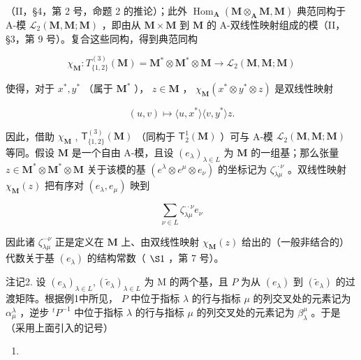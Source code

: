 （II，§4，第 2 号，命题 2 的推论）；此外 \(\operatorname{Hom}_{\mathbf{A}}(\mathbf{M} \otimes_{\mathbf{A}} \mathbf{M}, \mathbf{M})\) 典范同构于 A-模 \(\mathcal{L}_2(\mathbf{M}, \mathbf{M}; \mathbf{M})\) ，即由从 \(\mathbf{M} \times \mathbf{M}\) 到 \(\mathbf{M}\) 的 A-双线性映射组成的模（II，§3，第 9 号）。复合这些同构，得到典范同构

\[
\chi_ {\mathbf {M}} \colon T _ {\{1, 2 \}} ^ {(3)} (\mathbf {M}) = \mathbf {M} ^ {*} \otimes \mathbf {M} ^ {*} \otimes \mathbf {M} \rightarrow \mathcal {L} _ {2} (\mathbf {M}, \mathbf {M}; \mathbf {M})
\]

使得，对于 \(x^{*}, y^{*}\) （属于 \(\mathbf{M}^{*}\) ）， \(z \in \mathbf{M}\) ， \(\chi_{\mathbf{M}}(x^{*} \otimes y^{*} \otimes z)\) 是双线性映射

\[
(u, v) \mapsto \langle u, x ^ {*} \rangle \langle v, y ^ {*} \rangle z.
\]

因此，借助 \(\chi_{\mathbf{M}}\) , \(\mathsf{T}_{\{1,2\}}^{(3)}(\mathbf{M})\) （同构于 \(\mathsf{T}_{2}^{1}(\mathbf{M})\) ）可与 A-模 \(\mathcal{L}_2(\mathbf{M},\mathbf{M};\mathbf{M})\) 等同。假设 \(\mathbf{M}\) 是一个自由 A-模，且设 \((e_{\lambda})_{\lambda \in L}\) 为 \(\mathbf{M}\) 的一组基；那么张量 \(z\in \mathbf{M}^*\otimes \mathbf{M}^*\otimes \mathbf{M}\) 关于该模的基 \((e^{\lambda}\otimes e^{\mu}\otimes e_{\nu})\) 的坐标记为 \(\zeta_{\lambda \mu}^{\cdot \cdot \nu}\) 。双线性映射 \(\chi_{\mathbf{M}}(z)\) 把有序对 \((e_{\lambda},e_{\mu})\) 映到

\[
\sum_ {\nu \in L} \zeta_ {\lambda \mu}^{\cdot \cdot \nu} e _ {\nu}
\]

因此诸 \(\zeta_{\lambda \mu}^{\cdots \nu}\) 正是定义在 \(\mathbf{M}\) 上、由双线性映射 \(\chi_{\mathbf{M}}(z)\) 给出的（一般非结合的）代数关于基 \((e_{\lambda})\) 的结构常数（ \(\S 1\) ，第 7 号）。

注记2. 设 \((e_{\lambda})_{\lambda \in L}, (\tilde{e}_{\lambda})_{\lambda \in L}\) 为 M 的两个基，且 \(P\) 为从 \((e_{\lambda})\) 到 \((\tilde{e}_{\lambda})\) 的过渡矩阵。根据例1中所见， \(P\) 中位于指标 \(\lambda\) 的行与指标 \(\mu\) 的列交叉处的元素记为 \(\alpha_{\mu}^{\lambda}\) ，逆步 \(^{t}P^{-1}\) 中位于指标 \(\lambda\) 的行与指标 \(\mu\) 的列交叉处的元素记为 \(\beta_{\lambda}^{\mu}\) 。于是（采用上面引入的记号）

\begin{enumerate}
\def\labelenumi{(\arabic{enumi})}
\setcounter{enumi}{18}
\tightlist
\item
\end{enumerate}

